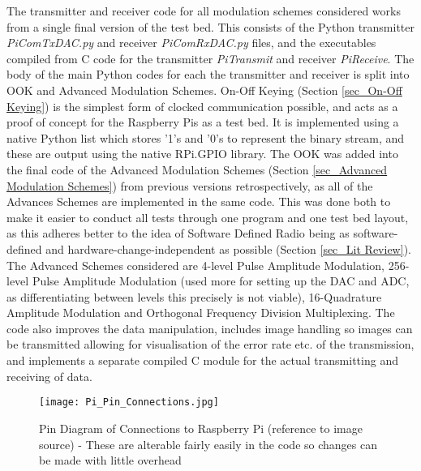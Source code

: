 \documentclass[../main.tex]{subfiles}
\begin{document}
The transmitter and receiver code for all modulation schemes considered works from a single final version of the test bed.
This consists of the Python transmitter \textit{PiComTx\textunderscore DAC.py} and receiver \textit{PiComRx\textunderscore DAC.py} files, and the executables compiled from C code for the transmitter \textit{PiTransmit} and receiver \textit{PiReceive}.
The body of the main Python codes for each the transmitter and receiver is split into OOK and Advanced Modulation Schemes.
On-Off Keying (Section \ref{sec_On-Off Keying}) is the simplest form of clocked communication possible, and acts as a proof of concept for the Raspberry Pis as a test bed.
It is implemented using a native Python list which stores '1's and '0's to represent the binary stream, and these are output using the native RPi.GPIO library.
The OOK was added into the final code of the Advanced Modulation Schemes (Section \ref{sec_Advanced Modulation Schemes})  from previous versions retrospectively, as all of the Advances Schemes are implemented in the same code.
This was done both to make it easier to conduct all tests through one program and one test bed layout, as this adheres better to the idea of Software Defined Radio being as software-defined and hardware-change-independent as possible (Section \ref{sec_Lit Review}).\\
The Advanced Schemes considered are 4-level Pulse Amplitude Modulation, 256-level Pulse Amplitude Modulation (used more for setting up the DAC and ADC, as differentiating between levels this precisely is not viable), 16-Quadrature Amplitude Modulation and Orthogonal Frequency Division Multiplexing.
The code also improves the data manipulation, includes image handling so images can be transmitted allowing for visualisation of the error rate etc. of the transmission, and implements a separate compiled C module for the actual transmitting and receiving of data.\\

\begin{figure}[ht]
	\centering
	\texttt{[image: Pi\_Pin\_Connections.jpg]}
	\caption{Pin Diagram of Connections to Raspberry Pi (reference to image source) - These are alterable fairly easily in the code so changes can be made with little overhead}
	\label{fig_Pin Connections}
\end{figure}
\end{document}
